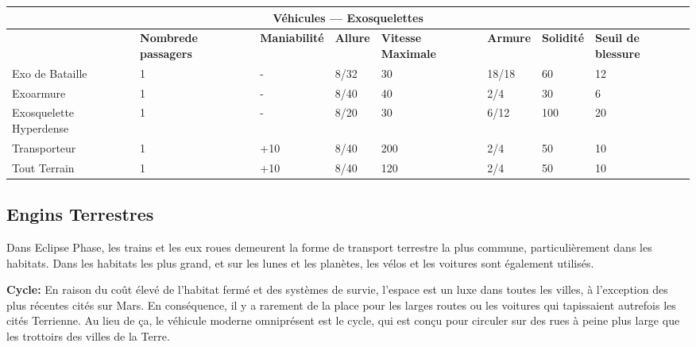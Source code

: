 {\begin{table} \begin{tabularx}{\textwidth}{|X|X|X|X|X|X|X|X|} \hline

\multicolumn{8}{|c|}{\textbf{Véhicules --- Exosquelettes}} \\ \hline

&\textbf{Nombre\newline de passagers}	&\textbf{Maniabilité}	&\textbf{Allure}	&\textbf{Vitesse Maximale}	&\textbf{Armure}	&\textbf{Solidité}	&\textbf{Seuil de blessure} \\ \hline

Exo de Bataille	&1	&- &8/32	&30	&18/18	&60	&12 \\ \hline

Exoarmure	&1	&- &8/40	&40	&2/4	&30	&6 \\ \hline

Exosquelette Hyperdense	&1	&- &8/20	&30	&6/12	&100	&20 \\ \hline

Transporteur	&1	&+10	&8/40	&200	&2/4	&50	&10 \\ \hline

Tout Terrain	&1	&+10	&8/40	&120	&2/4	&50	&10 \\ \hline

\end{tabularx} \label{tab:exoskeletons} \end{table} 









\subsection{Engins Terrestres} \label{sec:groundcraft} 

Dans Eclipse Phase, les trains et les eux roues demeurent la forme de transport terrestre la plus commune, particulièrement dans les habitats. Dans les habitats les plus grand, et sur les lunes et les planètes, les vélos et les voitures sont également utilisés. 

\textbf{Cycle:} En raison du coût élevé de l'habitat fermé et des systèmes de survie, l'espace est un luxe dans toutes les villes, à l'exception des plus récentes cités sur Mars. En conséquence, il y a rarement de la place pour les larges routes ou les voitures qui tapissaient autrefois les cités Terrienne. Au lieu de ça, le véhicule moderne omniprésent est le cycle, qui est conçu pour circuler sur des rues à peine plus large que les trottoirs des villes de la Terre. 

}
